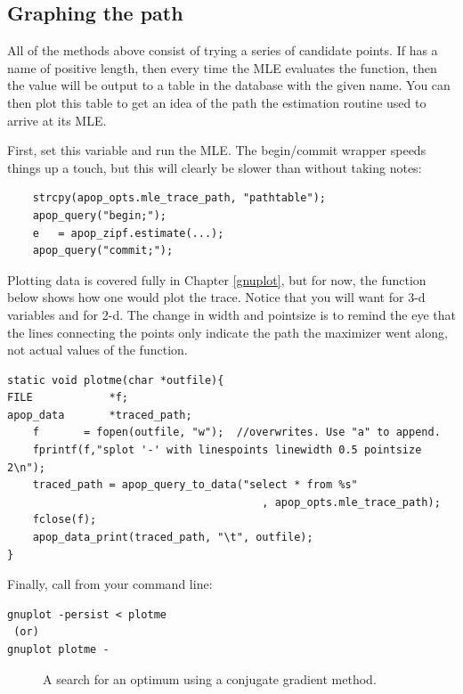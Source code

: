 \subsection{Graphing the path} All of the methods above consist of
trying a series of candidate points. 
If 
has a name of positive
length, then every time the MLE evaluates the function, then the value
will be output to a table in the database with the given name. You can
then plot this table to get an idea of the path the estimation routine
used to arrive at its MLE.

First, set this variable and run the MLE. The begin/commit wrapper
speeds things up a touch, but this will clearly be slower than without
taking notes:
\begin{lstlisting}
    strcpy(apop_opts.mle_trace_path, "pathtable");
    apop_query("begin;");
    e   = apop_zipf.estimate(...);
    apop_query("commit;");
\end{lstlisting}
Plotting data is covered fully in Chapter \ref{gnuplot}, but for now,
the function below shows how one would plot the trace.  Notice that you will want
 for 3-d variables and  for 2-d. The change in width
and pointsize is to remind the eye that the lines connecting the points
only indicate the path the maximizer went along, not actual values of
the function.
\begin{lstlisting}
static void plotme(char *outfile){
FILE            *f;
apop_data       *traced_path;
    f       = fopen(outfile, "w");  //overwrites. Use "a" to append.
    fprintf(f,"splot '-' with linespoints linewidth 0.5 pointsize 2\n");
    traced_path = apop_query_to_data("select * from %s"
                                        , apop_opts.mle_trace_path);
    fclose(f);
    apop_data_print(traced_path, "\t", outfile);
}
\end{lstlisting}

Finally, call  from your command line:
\begin{lstlisting}
gnuplot -persist < plotme
 (or)
gnuplot plotme -
\end{lstlisting}

\begin{figure}
\caption{A search for an optimum using a conjugate gradient method.}
\end{figure}

